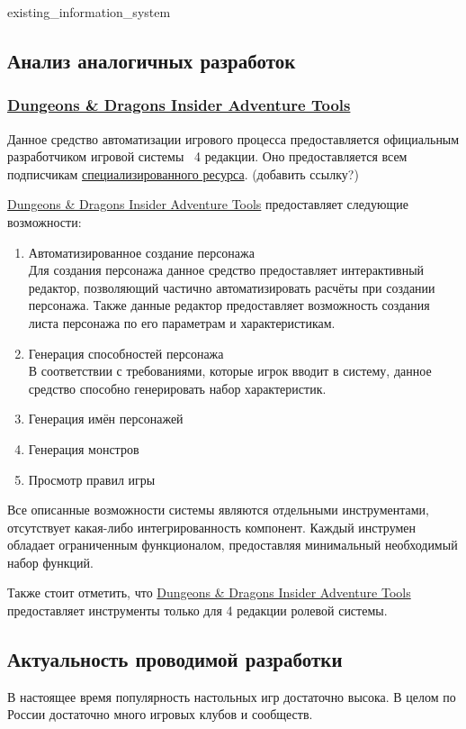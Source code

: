 {existing_information_system}


\subsection{Анализ аналогичных разработок}
\subsubsection{\href{http://www.wizards.com/dnd/Tool.aspx?x=dnd/4new/tool/adventuretools}{Dungeons \& Dragons Insider Adventure Tools}}
Данное средство автоматизации игрового процесса предоставляется официальным разработчиком игровой системы \dnd\ 4 редакции. Оно предоставляется всем подписчикам \href{http://www.wizards.com/dnd}{специализированного ресурса}. (добавить ссылку?)

\href{http://www.wizards.com/dnd/Tool.aspx?x=dnd/4new/tool/adventuretools}{Dungeons \& Dragons Insider Adventure Tools} предоставляет следующие возможности:
\begin{enumerate}
\item Автоматизированное создание персонажа\\
Для создания персонажа данное средство предоставляет интерактивный редактор, позволяющий частично автоматизировать расчёты при создании персонажа. Также данные редактор предоставляет возможность создания листа персонажа по его параметрам и характеристикам.
\item Генерация способностей персонажа\\
В соответствии с требованиями, которые игрок вводит в систему, данное средство способно генерировать набор характеристик.
\item Генерация имён персонажей
\item Генерация монстров
\item Просмотр правил игры
\end{enumerate}

Все описанные возможности системы являются отдельными инструментами, отсутствует какая-либо интегрированность компонент. Каждый инструмен обладает ограниченным функционалом, предоставляя минимальный необходимый набор функций.

Также стоит отметить, что \href{http://www.wizards.com/dnd/Tool.aspx?x=dnd/4new/tool/adventuretools}{Dungeons \& Dragons Insider Adventure Tools} предоставляет инструменты только для 4 редакции ролевой системы.


\subsection{Актуальность проводимой разработки}

В настоящее время популярность настольных игр достаточно высока. В целом по России достаточно много игровых клубов и сообществ.
